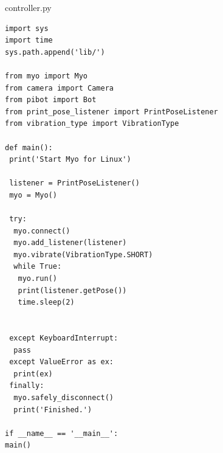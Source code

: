 \documentclass[12pt,a4paper,oneside,openany]{book}
\begin{document}
\pagebreak
controller.py
\begin{verbatim}
import sys
import time
sys.path.append('lib/')

from myo import Myo
from camera import Camera
from pibot import Bot
from print_pose_listener import PrintPoseListener
from vibration_type import VibrationType

def main():
 print('Start Myo for Linux')

 listener = PrintPoseListener()
 myo = Myo()

 try:
  myo.connect()
  myo.add_listener(listener)
  myo.vibrate(VibrationType.SHORT)
  while True:
   myo.run()
   print(listener.getPose())
   time.sleep(2)


 except KeyboardInterrupt:
  pass
 except ValueError as ex:
  print(ex)
 finally:
  myo.safely_disconnect()
  print('Finished.')

if __name__ == '__main__':
main()

\end{verbatim}
\end{document}
